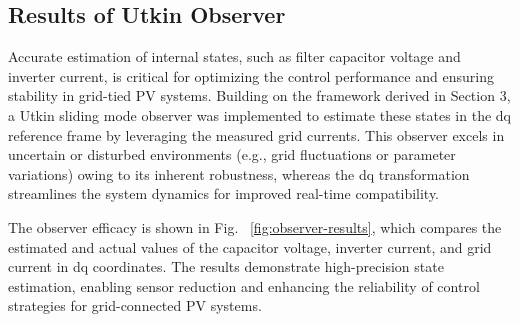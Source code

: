 \documentclass[preprint,12pt]{elsarticle}
\begin{document}
\subsection{Results of Utkin Observer}
Accurate estimation of internal states, such as filter capacitor voltage and inverter current, is critical for optimizing the control performance and ensuring stability in grid-tied PV systems. Building on the framework derived in Section 3, a Utkin sliding mode observer was implemented to estimate these states in the dq reference frame by leveraging the measured grid currents. This observer excels in uncertain or disturbed environments (e.g., grid fluctuations or parameter variations) owing to its inherent robustness, whereas the dq transformation streamlines the system dynamics for improved real-time compatibility.

The observer efficacy is shown in Fig. ~\ref{fig:observer-results}, which compares the estimated and actual values of the capacitor voltage, inverter current, and grid current in dq coordinates. The results demonstrate high-precision state estimation, enabling sensor reduction and enhancing the reliability of control strategies for grid-connected PV systems.
\end{document}
